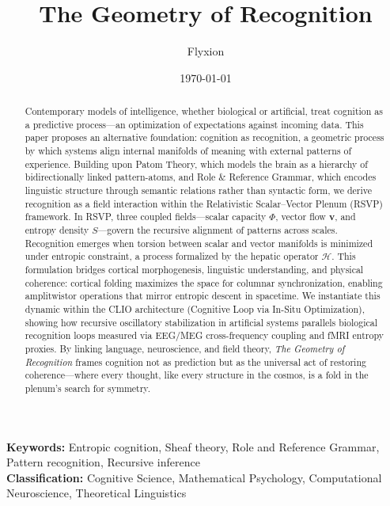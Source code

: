 \documentclass[11pt]{article}
\title{The Geometry of Recognition}
\author{Flyxion}
\date{\today}
\begin{document}
\maketitle

\begin{abstract}
Contemporary models of intelligence, whether biological or artificial, treat cognition as a predictive process---an optimization of expectations against incoming data. This paper proposes an alternative foundation: cognition as recognition, a geometric process by which systems align internal manifolds of meaning with external patterns of experience. Building upon Patom Theory, which models the brain as a hierarchy of bidirectionally linked pattern-atoms, and Role \& Reference Grammar, which encodes linguistic structure through semantic relations rather than syntactic form, we derive recognition as a field interaction within the Relativistic Scalar--Vector Plenum (RSVP) framework. In RSVP, three coupled fields---scalar capacity $\Phi$, vector flow $\mathbf{v}$, and entropy density $S$---govern the recursive alignment of patterns across scales. Recognition emerges when torsion between scalar and vector manifolds is minimized under entropic constraint, a process formalized by the hepatic operator $\mathcal{H}$. This formulation bridges cortical morphogenesis, linguistic understanding, and physical coherence: cortical folding maximizes the space for columnar synchronization, enabling amplitwistor operations that mirror entropic descent in spacetime. We instantiate this dynamic within the CLIO architecture (Cognitive Loop via In-Situ Optimization), showing how recursive oscillatory stabilization in artificial systems parallels biological recognition loops measured via EEG/MEG cross-frequency coupling and fMRI entropy proxies. By linking language, neuroscience, and field theory, \textit{The Geometry of Recognition} frames cognition not as prediction but as the universal act of restoring coherence---where every thought, like every structure in the cosmos, is a fold in the plenum’s search for symmetry.
\end{abstract}

\begin{center}
\textbf{Keywords:} Entropic cognition, Sheaf theory, Role and Reference Grammar, Pattern recognition, Recursive inference \\
\textbf{Classification:} Cognitive Science, Mathematical Psychology, Computational Neuroscience, Theoretical Linguistics
\end{center}
\end{document}
